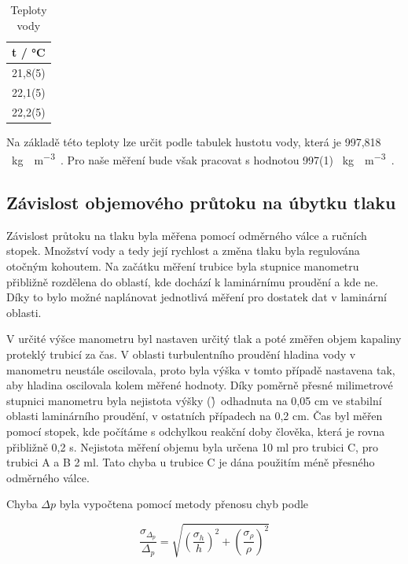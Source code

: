     \begin{table}[h]
        \centering
        \caption{Teploty vody}
        \label{tab:teploty_vody}
        \begin{tabular}{|c|} 
        \hline
            t / °C   \\ 
        \hline
            21,8(5)  \\
            22,1(5)  \\
            22,2(5)  \\
        \hline
        \end{tabular}
    \end{table}

    Na základě této teploty lze určit podle tabulek hustotu vody, která je 997,818 \SI{}{\kg\water\per\m\cubed\air}. Pro naše měření bude však pracovat s hodnotou 997(1) \SI{}{\kg\water\per\m\cubed\air}.

\subsection{Závislost objemového průtoku na úbytku tlaku}

    Závislost průtoku na tlaku byla měřena pomocí odměrného válce a ručních stopek. Množství vody a tedy její rychlost a změna tlaku byla regulována otočným kohoutem. Na začátku měření trubice byla stupnice manometru přibližně rozdělena do oblastí, kde dochází k laminárnímu proudění a kde ne. Díky to bylo možné naplánovat jednotlivá měření pro dostatek dat v laminární oblasti.

    V určité výšce manometru byl nastaven určitý tlak a poté změřen objem kapaliny proteklý trubicí za čas. V oblasti turbulentního proudění hladina vody v manometru neustále oscilovala, proto byla výška v tomto případě nastavena tak, aby hladina oscilovala kolem měřené hodnoty. Díky poměrně přesné milimetrové stupnici manometru byla nejistota výšky (\h)\ odhadnuta na 0,05 cm ve stabilní oblasti laminárního proudění, v ostatních případech na 0,2 cm. Čas byl měřen pomocí stopek, kde počítáme s odchylkou reakční doby člověka, která je rovna přibližně 0,2 s. Nejistota měření objemu byla určena 10 ml pro trubici C, pro trubici A a B 2 ml. Tato chyba u trubice C je dána použitím méně přesného odměrného válce.
    
    Chyba \(\Delta p\) byla vypočtena pomocí metody přenosu chyb podle

    \begin{equation}
        \frac{\sigma_\Delta_p}{\Delta_p} = \sqrt{(\frac{\sigma_h}{h})^2 + (\frac{\sigma_\rho}{\rho})^2}
    \end{equation}

